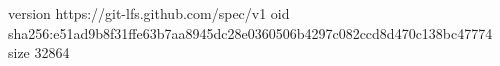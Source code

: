 version https://git-lfs.github.com/spec/v1
oid sha256:e51ad9b8f31ffe63b7aa8945dc28e0360506b4297c082ccd8d470c138bc47774
size 32864
